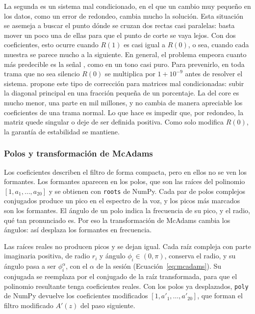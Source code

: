 \documentclass[10pt,twocolumn]{article}
\newcommand{\textcite}[1]{\citet{#1}}
\newcommand{\parencite}[1]{\citep{#1}}
\begin{document}
La segunda es un sistema mal condicionado, en el que un cambio muy pequeño en los datos, como un error de redondeo, cambia mucho la solución. Esta situación se asemeja a buscar el punto dónde se cruzan dos rectas casi paralelas: basta mover un poco una de ellas para que el punto de corte se vaya lejos. Con dos coeficientes, esto ocurre cuando $R(1)$ es casi igual a $R(0)$, o sea, cuando cada muestra se parece mucho a la siguiente. En general, el problema empeora cuanto más predecible es la señal \parencite{makhoul1975}, como en un tono casi puro. Para prevenirlo, en toda trama que no sea silencio $R(0)$ se multiplica por $1+10^{-9}$ antes de resolver el sistema. \textcite{makhoul1975} propone este tipo de corrección para matrices mal condicionadas: subir la diagonal principal en una fracción pequeña de un porcentaje. La del core es mucho menor, una parte en mil millones, y no cambia de manera apreciable los coeficientes de una trama normal. Lo que hace es impedir que, por redondeo, la matriz quede singular o deje de ser definida positiva. Como solo modifica $R(0)$, la garantía de estabilidad se mantiene.

\subsubsection{Polos y transformación de McAdams}\label{sec:4.3.4}

Los coeficientes describen el filtro de forma compacta, pero en ellos no se ven los formantes. Los formantes aparecen en los polos, que son las raíces del polinomio $[1,a_1,\ldots,a_{20}]$ y se obtienen con \texttt{roots} de NumPy. Cada par de polos complejos conjugados produce un pico en el espectro de la voz, y los picos más marcados son los formantes. El ángulo de un polo indica la frecuencia de su pico, y el radio, qué tan pronunciado es. Por eso la transformación de McAdams cambia los ángulos: así desplaza los formantes en frecuencia.

Las raíces reales no producen picos y se dejan igual. Cada raíz compleja con parte imaginaria positiva, de radio $r_i$ y ángulo $\phi_i\in(0,\pi)$, conserva el radio, y su ángulo pasa a ser $\phi_i^{\alpha}$, con el $\alpha$ de la sesión (Ecuación~\ref{eq:mcadams}). Su conjugada se reemplaza por el conjugado de la raíz transformada, para que el polinomio resultante tenga coeficientes reales. Con los polos ya desplazados, \texttt{poly} de NumPy devuelve los coeficientes modificados $[1,a'_1,\ldots,a'_{20}]$, que forman el filtro modificado $A'(z)$ del paso siguiente.
\end{document}
